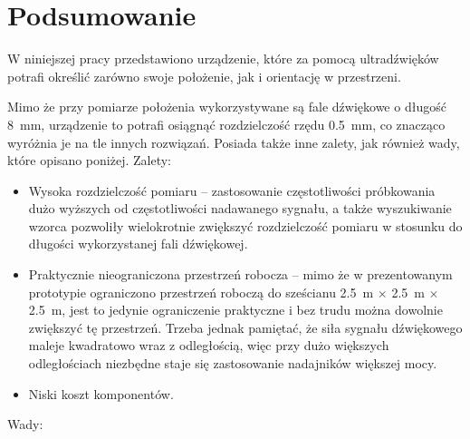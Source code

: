 \chapter{Podsumowanie}

W niniejszej pracy przedstawiono urządzenie, które za pomocą ultradźwięków  potrafi określić zarówno swoje
położenie, jak i orientację w przestrzeni.

Mimo że przy pomiarze położenia wykorzystywane są fale dźwiękowe o długość \SI{8}{mm}, urządzenie to
potrafi osiągnąć rozdzielczość  rzędu \SI{0,5}{mm}, co znacząco wyróżnia je na tle innych rozwiązań.
Posiada także inne zalety, jak również wady, które opisano poniżej.
\newline
Zalety:
\begin{itemize}
 \item Wysoka rozdzielczość pomiaru -- zastosowanie częstotliwości 
 próbkowania dużo wyższych od częstotliwości nadawanego sygnału, a także wyszukiwanie wzorca pozwoliły
 wielokrotnie zwiększyć rozdzielczość pomiaru w stosunku do długości wykorzystanej fali dźwiękowej.
 
 \item Praktycznie nieograniczona przestrzeń robocza -- mimo że w prezentowanym prototypie
 ograniczono przestrzeń roboczą do sześcianu \SI{2,5}{m} $\times$ \SI{2,5}{m} $\times$ \SI{2,5}{m},
 jest to jedynie ograniczenie praktyczne i bez trudu można dowolnie zwiększyć tę przestrzeń. Trzeba jednak 
 pamiętać, że siła sygnału dźwiękowego maleje kwadratowo wraz z odległością, więc przy dużo większych odległościach
 niezbędne staje się zastosowanie nadajników większej mocy. 
 
 \item Niski koszt komponentów.
\end{itemize}
Wady:

